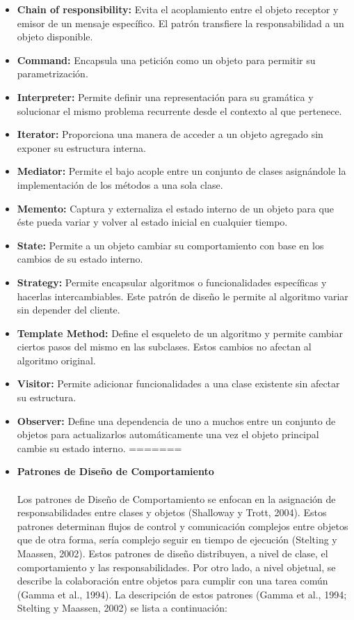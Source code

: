 \documentclass[twoside,twocolumn]{article}
\begin{document}
\begin{itemize}
\begin{itemize}
	\begin{itemize}
		\item \textbf{Chain of responsibility:}	Evita el acoplamiento entre el objeto receptor y emisor de un mensaje específico. El patrón transfiere la responsabilidad a un objeto disponible.  
		\item \textbf{Command:} Encapsula una petición como un objeto para permitir su parametrización.   
		\item \textbf{Interpreter:} Permite definir una representación para su gramática y solucionar el mismo problema recurrente desde el contexto al que pertenece.  
		\item \textbf{Iterator:}	Proporciona una manera de acceder a un objeto agregado sin exponer su estructura interna.  
		\item \textbf{Mediator:}  Permite el bajo acople entre un conjunto de clases asignándole la implementación de los métodos a una sola clase.   
		\item \textbf{Memento:} Captura y externaliza el estado interno de un objeto para que éste pueda variar y volver al estado inicial en cualquier tiempo.   
		\item \textbf{State:} Permite a un objeto cambiar su comportamiento con base en los cambios de su estado interno.  
        \item \textbf{Strategy:} Permite encapsular algoritmos o funcionalidades específicas y hacerlas intercambiables. Este patrón de diseño le permite al algoritmo variar sin depender del cliente.  
        \item \textbf{Template Method:} Define el esqueleto de un algoritmo y permite cambiar ciertos pasos del mismo en las subclases. Estos cambios no afectan al algoritmo original.  
        \item \textbf{Visitor:} Permite adicionar funcionalidades a una clase existente sin afectar su estructura. 
        \item \textbf{Observer:} Define una dependencia de uno a muchos entre un conjunto de objetos para actualizarlos automáticamente una vez el objeto principal cambie su estado interno. 
=======
	
    \item \textbf{Patrones de Diseño de Comportamiento }
	\\
	\\Los patrones de Diseño de Comportamiento se enfocan en la asignación de responsabilidades entre clases y objetos (Shalloway y Trott, 2004). 
    Estos patrones determinan flujos de control y comunicación complejos entre objetos que de otra forma, sería complejo seguir en tiempo de ejecución (Stelting y Maassen, 2002). Estos patrones de diseño distribuyen, a nivel de clase, el comportamiento y las responsabilidades. Por otro lado, a nivel objetual, se describe la colaboración entre objetos para cumplir con una tarea común (Gamma et al., 1994). La descripción de estos patrones (Gamma et al., 1994; Stelting y Maassen, 2002) se lista a continuación:
    

\end{itemize}
\end{itemize}
\end{itemize}
\end{document}
